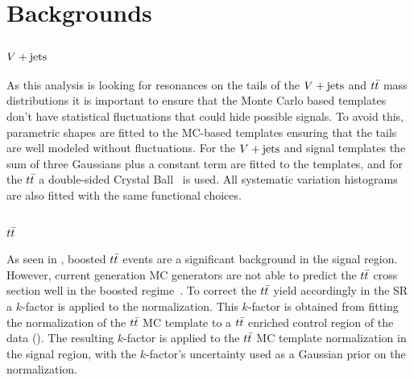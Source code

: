 \section{Backgrounds}\label{sec:analysis_backgrounds}

\subsection{$V + \text{jets}$}

As this analysis is looking for resonances on the tails of the $V + \text{jets}$ and $t\bar{t}$ mass distributions it is important to ensure that the Monte Carlo based templates don't have statistical fluctuations that could hide possible signals.
To avoid this, parametric shapes are fitted to the MC-based templates ensuring that the tails are well modeled without fluctuations.
For the $V + \text{jets}$ and signal templates the sum of three Gaussians plus a constant term are fitted to the templates, and for the $t\bar{t}$ a double-sided Crystal Ball~\cite{Gaiser:1982yw} is used.
All systematic variation histograms are also fitted with the same functional choices.

\subsection{$t\bar{t}$}\label{sec:ttbar}

As seen in , boosted $t\bar{t}$ events are a significant background in the signal region.
However, current generation MC generators are not able to predict the $t\bar{t}$ cross section well in the boosted regime~\cite{ATL-PHYS-PUB-2018-009}.
To correct the $t\bar{t}$ yield accordingly in the SR a $k$-factor is applied to the normalization.
This $k$-factor is obtained from fitting the normalization of the $t\bar{t}$ MC template to a $t\bar{t}$ enriched control region of the data (\CRttbar{}).
The resulting $k$-factor is applied to the $t\bar{t}$ MC template normalization in the signal region, with the $k$-factor's uncertainty used as a Gaussian prior on the normalization.

